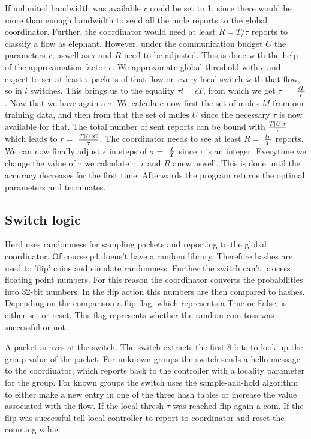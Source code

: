 \documentclass[11pt,oneside,a4paper]{article}
\begin{document}
If unlimited bandwidth was available $r$ could be set to 1, since there would be more than enough bandwidth to send all the mule reports to the global coordinator. Further, the coordinator would need at least $R = T/\tau$ reports to classify a flow as elephant. However, under the communication budget $C$ the parameters $r$, aswell as $\tau$ and $R$ need to be adjusted. This is done with the help of the approximation factor $\epsilon$. We approximate global threshold with $\epsilon$ and expect to see at least $\tau$ packets of that flow on every local switch with that flow, so in $l$ switches. This brings us to the equality $\tau l = \epsilon T$, from which we get $\tau =$ $\epsilon T\over l$. Now that we have again a $\tau$. We calculate now first the set of moles $M$ from our training data, and then from that the set of mules $U$ since the necessary $\tau$ is now available for that. The total number of sent reports can be bound with $T|U|r\over \tau$ which leads to $r =$ $T|U|C\over \tau$. The coordinator needs to see at least $R =$ $lr\over T$ reports. We can now finally adjust $\epsilon$ in steps of $\sigma =$ $l\over T$ since $\tau$ is an integer. Everytime we change the value of $\tau$ we calculate $\tau$, $r$ and $R$ anew aswell. This is done until the accuracy decreases for the first time. Afterwards the program returns the optimal parameters and terminates.

\subsection{Switch logic} \label{switch}
Herd uses randomness for sampling packets and reporting to the global coordinator. Of course p4 doens't have a random library. Therefore hashes are used to 'flip' coins and simulate randomness. Further the switch can't process floating point numbers. For this reason the coordinator converts the probabilities into 32-bit numbers. In the flip action this numbers are then compared to hashes. Depending on the comparison a flip-flag, which represents a True or False, is either set or reset. This flag represents whether the random coin toss was successful or not.

A packet arrives at the switch. The switch extracts the first 8 bits to look up the group value of the packet. For unknown groups the switch sends a hello message to the coordinator, which reports back to the controller with a locality parameter for the group. For known groups the switch uses the sample-and-hold algorithm to either make a new entry in one of the three hash tables or increase the value associated with the flow. If the local thresh $\tau$ was reached flip again a coin. If the flip was successful tell local controller to report to coordinator and reset the counting value. 
\end{document}
